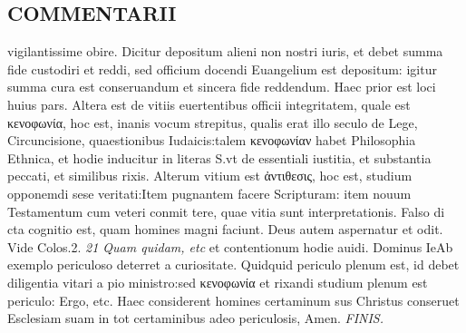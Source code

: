 \documentclass{article}
\begin{document}
\begin{pages}
\section*{COMMENTARII }
\marginpar{[ p.170 ]}\pstart vigilantissime obire. Dicitur depositum alieni non nostri iuris, et debet summa fide custodiri et reddi, sed officium docendi Euangelium est depositum: igitur summa cura est conseruandum et sincera fide reddendum. Haec prior est loci huius pars. Altera est de vitiis euertentibus officii integritatem, quale est κενοφωνία, hoc est, inanis vocum strepitus, qualis erat illo seculo de Lege, Circuncisione, quaestionibus Iudaicis:talem κενοφωνίαν habet Philosophia Ethnica, et hodie inducitur in literas S.vt de essentiali iustitia, et substantia peccati, et similibus rixis. Alterum vitium est ἀντιθεσις, hoc est, studium opponemdi sese veritati:Item pugnantem facere Scripturam: item nouum Testamentum cum veteri conmit tere, quae vitia sunt interpretationis. Falso di cta cognitio est, quam homines magni faciunt. Deus autem aspernatur et odit. Vide Colos.2.  \pend
\textit{21 Quam quidam, etc }\pstart et contentionum hodie auidi. Dominus IeAb exemplo periculoso deterret a curiositate. Quidquid periculo plenum est, id debet diligentia vitari a pio ministro:sed κενοφωνία et rixandi studium plenum est periculo: Ergo, etc. Haec considerent homines certaminum sus Christus conseruet Esclesiam suam in tot certaminibus adeo periculosis, Amen.  \pend
\textit{FINIS. }
\end{pages}
\end{document}
